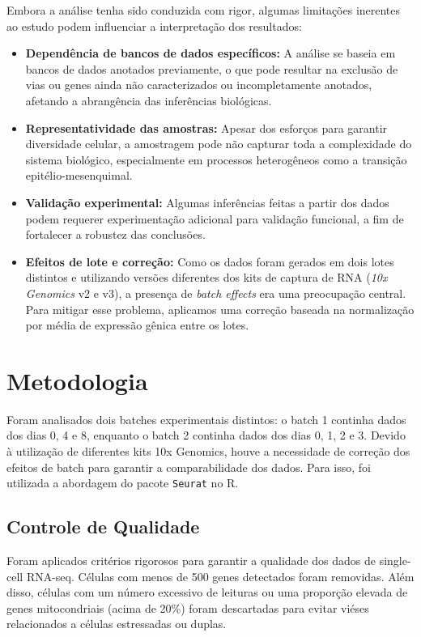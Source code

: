 \documentclass[12pt]{article}
\begin{document}
Embora a análise tenha sido conduzida com rigor, algumas limitações inerentes ao estudo podem influenciar a interpretação dos resultados:

\begin{itemize}
    \item \textbf{Dependência de bancos de dados específicos:} A análise se baseia em bancos de dados anotados previamente, o que pode resultar na exclusão de vias ou genes ainda não caracterizados ou incompletamente anotados, afetando a abrangência das inferências biológicas.
    
    \item \textbf{Representatividade das amostras:} Apesar dos esforços para garantir diversidade celular, a amostragem pode não capturar toda a complexidade do sistema biológico, especialmente em processos heterogêneos como a transição epitélio-mesenquimal.
    
    \item \textbf{Validação experimental:} Algumas inferências feitas a partir dos dados podem requerer experimentação adicional para validação funcional, a fim de fortalecer a robustez das conclusões.
    
    \item \textbf{Efeitos de lote e correção:} Como os dados foram gerados em dois lotes distintos e utilizando versões diferentes dos kits de captura de RNA (\textit{10x Genomics} v2 e v3), a presença de \textit{batch effects} era uma preocupação central. Para mitigar esse problema, aplicamos uma correção baseada na normalização por média de expressão gênica entre os lotes.

\end{itemize}



\newpage
\section{Metodologia}

Foram analisados dois batches experimentais distintos: o batch 1 continha dados dos dias 0, 4 e 8, enquanto o batch 2 continha dados dos dias 0, 1, 2 e 3. Devido à utilização de diferentes kits 10x Genomics, houve a necessidade de correção dos efeitos de batch para garantir a comparabilidade dos dados. Para isso, foi utilizada a abordagem do pacote \texttt{Seurat} no R.

\subsection{Controle de Qualidade}
Foram aplicados critérios rigorosos para garantir a qualidade dos dados de single-cell RNA-seq. Células com menos de 500 genes detectados foram removidas. Além disso, células com um número excessivo de leituras ou uma proporção elevada de genes mitocondriais (acima de 20\%) foram descartadas para evitar viéses relacionados a células estressadas ou duplas.
\end{document}
